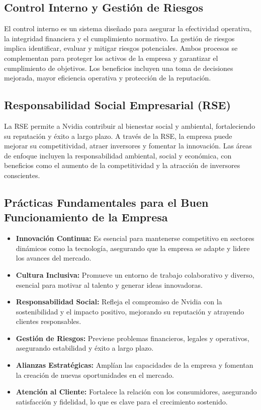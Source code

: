 \documentclass{article}
\begin{document}
\subsection{Control Interno y Gestión de Riesgos}

El control interno es un sistema diseñado para asegurar la efectividad operativa, la integridad financiera y el cumplimiento normativo. La gestión de riesgos implica identificar, evaluar y mitigar riesgos potenciales. Ambos procesos se complementan para proteger los activos de la empresa y garantizar el cumplimiento de objetivos. Los beneficios incluyen una toma de decisiones mejorada, mayor eficiencia operativa y protección de la reputación.

\subsection{Responsabilidad Social Empresarial (RSE)}

La RSE permite a Nvidia contribuir al bienestar social y ambiental, fortaleciendo su reputación y éxito a largo plazo. A través de la RSE, la empresa puede mejorar su competitividad, atraer inversores y fomentar la innovación. Las áreas de enfoque incluyen la responsabilidad ambiental, social y económica, con beneficios como el aumento de la competitividad y la atracción de inversores conscientes.

\subsection{Prácticas Fundamentales para el Buen Funcionamiento de la Empresa}

\begin{itemize}
  \item \textbf{Innovación Continua:} Es esencial para mantenerse competitivo en sectores dinámicos como la tecnología, asegurando que la empresa se adapte y lidere los avances del mercado.
  \item \textbf{Cultura Inclusiva:} Promueve un entorno de trabajo colaborativo y diverso, esencial para motivar al talento y generar ideas innovadoras.
  \item \textbf{Responsabilidad Social:} Refleja el compromiso de Nvidia con la sostenibilidad y el impacto positivo, mejorando su reputación y atrayendo clientes responsables.
  \item \textbf{Gestión de Riesgos:} Previene problemas financieros, legales y operativos, asegurando estabilidad y éxito a largo plazo.
  \item \textbf{Alianzas Estratégicas:} Amplían las capacidades de la empresa y fomentan la creación de nuevas oportunidades en el mercado.
  \item \textbf{Atención al Cliente:} Fortalece la relación con los consumidores, asegurando satisfacción y fidelidad, lo que es clave para el crecimiento sostenido.
\end{itemize}
\end{document}
